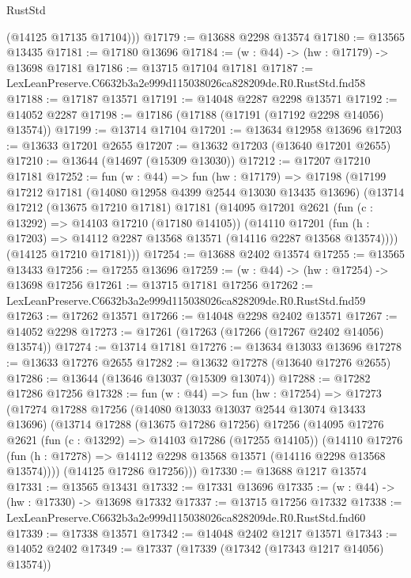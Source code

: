 \begin{lexlean}{RustStd}
\begin{coremodule}
        (@14125 @17135 @17104)))
@17179 := @13688 @2298 @13574
@17180 := @13565 @13435
@17181 := @17180 @13696
@17184 := (w : @44) -> (hw : @17179) -> @13698 @17181
@17186 := @13715 @17104 @17181
@17187 := LexLeanPreserve.C6632b3a2e999d115038026ca828209de.R0.RustStd.fnd58
@17188 := @17187 @13571
@17191 := @14048 @2287 @2298 @13571
@17192 := @14052 @2287
@17198 := @17186 (@17188 (@17191 (@17192 @2298 @14056) @13574))
@17199 := @13714 @17104
@17201 := @13634 @12958 @13696
@17203 := @13633 @17201 @2655
@17207 := @13632 @17203 (@13640 @17201 @2655)
@17210 := @13644 (@14697 (@15309 @13030))
@17212 := @17207 @17210 @17181
@17252 := fun (w : @44) =>
  fun (hw : @17179) =>
  @17198
    (@17199
      @17212
      @17181
      (@14080 @12958 @4399 @2544 @13030 @13435 @13696)
      (@13714
        @17212
        (@13675 @17210 @17181)
        @17181
        (@14095
          @17201
          @2621
          (fun (c : @13292) => @14103 @17210 (@17180 @14105))
          (@14110
            @17201
            (fun (h : @17203) => @14112 @2287 @13568 @13571 (@14116 @2287 @13568 @13574))))
        (@14125 @17210 @17181)))
@17254 := @13688 @2402 @13574
@17255 := @13565 @13433
@17256 := @17255 @13696
@17259 := (w : @44) -> (hw : @17254) -> @13698 @17256
@17261 := @13715 @17181 @17256
@17262 := LexLeanPreserve.C6632b3a2e999d115038026ca828209de.R0.RustStd.fnd59
@17263 := @17262 @13571
@17266 := @14048 @2298 @2402 @13571
@17267 := @14052 @2298
@17273 := @17261 (@17263 (@17266 (@17267 @2402 @14056) @13574))
@17274 := @13714 @17181
@17276 := @13634 @13033 @13696
@17278 := @13633 @17276 @2655
@17282 := @13632 @17278 (@13640 @17276 @2655)
@17286 := @13644 (@13646 @13037 (@15309 @13074))
@17288 := @17282 @17286 @17256
@17328 := fun (w : @44) =>
  fun (hw : @17254) =>
  @17273
    (@17274
      @17288
      @17256
      (@14080 @13033 @13037 @2544 @13074 @13433 @13696)
      (@13714
        @17288
        (@13675 @17286 @17256)
        @17256
        (@14095
          @17276
          @2621
          (fun (c : @13292) => @14103 @17286 (@17255 @14105))
          (@14110
            @17276
            (fun (h : @17278) => @14112 @2298 @13568 @13571 (@14116 @2298 @13568 @13574))))
        (@14125 @17286 @17256)))
@17330 := @13688 @1217 @13574
@17331 := @13565 @13431
@17332 := @17331 @13696
@17335 := (w : @44) -> (hw : @17330) -> @13698 @17332
@17337 := @13715 @17256 @17332
@17338 := LexLeanPreserve.C6632b3a2e999d115038026ca828209de.R0.RustStd.fnd60
@17339 := @17338 @13571
@17342 := @14048 @2402 @1217 @13571
@17343 := @14052 @2402
@17349 := @17337 (@17339 (@17342 (@17343 @1217 @14056) @13574))

\end{coremodule}
\end{lexlean}
